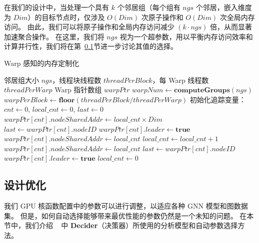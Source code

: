 在我们的设计中，当处理一个具有 $k$ 个邻居组（每个组有 $ngs$ 个邻居，嵌入维度为 $Dim$）的目标节点时，仅涉及 $O(Dim)$ 次原子操作和 $O(Dim)$ 次全局内存访问。
由此，我们可以将原子操作和全局内存访问减少 $(k\cdot ngs)$ 倍，从而显著加速聚合操作。
在这里，我们将 $ngs$ 视为一个超参数，用以平衡内存访问效率和计算并行性，我们将在第~\ref{sect: analytical modeling}节进一步讨论其值的选择。
\begin{algorithm}[htbp]
    \caption{Warp 感知的内存定制化}
    \label{alg: memory-organization}
    \begin{algorithmic}[1]
        \Require 邻居组大小 $\mathit{ngs}$，线程块线程数 $\mathit{threadPerBlock}$，每 Warp 线程数 $\mathit{threadPerWarp}$
        \Ensure Warp 指针数组 $\mathit{warpPtr}$
        \State $\mathit{warpNum} \gets \textbf{computeGroups}(\mathit{ngs})$ 
        \State $\mathit{warpPerBlock} \gets \textbf{floor}(\mathit{threadPerBlock} / \mathit{threadPerWarp})$ 
        \State 初始化追踪变量：$\mathit{cnt} \gets 0$, $\mathit{local\_cnt} \gets 0$, $\mathit{last} \gets 0$
             
                \State $\mathit{warpPtr[cnt].nodeSharedAddr} \gets \mathit{local\_cnt} \times \mathit{Dim}$
                \State $\mathit{last} \gets \mathit{warpPtr[cnt].nodeID}$
                \State $\mathit{warpPtr[cnt].leader} \gets \textbf{true}$
            \Else
                 
                    \State $\mathit{warpPtr[cnt].nodeSharedAddr} \gets \mathit{local\_cnt}$
                \Else {}
                    \State $\mathit{local\_cnt} \gets \mathit{local\_cnt} + 1$
                    \State $\mathit{warpPtr[cnt].nodeSharedAddr} \gets \mathit{local\_cnt}$
                    \State $\mathit{last} \gets \mathit{warpPtr[cnt].nodeID}$
                    \State $\mathit{warpPtr[cnt].leader} \gets \textbf{true}$
                \EndIf
            \EndIf
             
                \State $\mathit{local\_cnt} \gets 0$
            \EndIf
        \EndWhile
    \end{algorithmic}
\end{algorithm}
\subsection{设计优化}
\label{sect: analytical modeling}
\vspace{-5pt}
我们 GPU 核函数配置中的参数可以进行调整，以适应各种 GNN 模型和图数据集。
但是，如何自动选择能够带来最优性能的参数仍然是一个未知的问题。
在本节中，我们介绍 ~\Mname{} 中 \textbf{Decider}（决策器）所使用的分析模型和自动参数选择方法。

